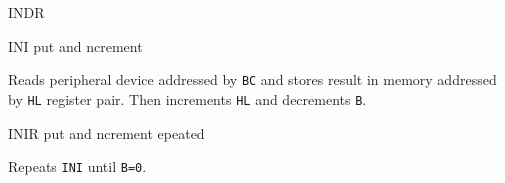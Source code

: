 \begin{basedescript}{
    \desclabelstyle{\multilinelabel}
    \desclabelwidth{3cm}}
\begin{DetailItem}{INDR}
        \begin{DetailTiming}
        \end{DetailTiming}

    \end{DetailItem}

    \pagebreak
    \begin{DetailItem}{INI}
        {put and ncrement}
        {\SymINI}

        Reads peripheral device addressed by {\tt BC} and stores result in memory addressed by {\tt HL} register pair. Then increments {\tt HL} and decrements {\tt B}.

        \begin{DetailEffects}
            \FlagsINI
            \end{DetailEffects}
				
        \begin{DetailTiming}
        \end{DetailTiming}

    \end{DetailItem}

    \begin{DetailItem}{INIR}
        {put and ncrement epeated}
        {\SymINIR}

        Repeats {\tt INI} until {\tt B=0}.

        \begin{DetailEffects}
            \FlagsINIR
            \end{DetailEffects}
				
        \begin{DetailTiming}
        \end{DetailTiming}


\end{DetailItem}
\end{basedescript}

